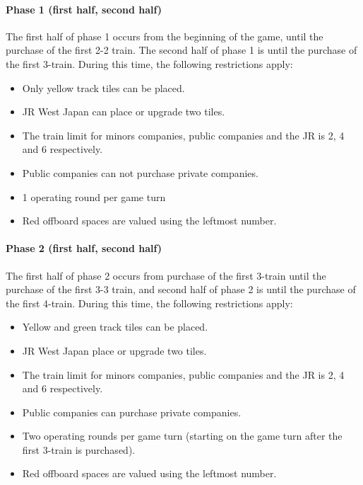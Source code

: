 \documentclass{article}
\begin{document}
\begin{CJK}{UTF8}{min}
\begin{multicols}{2}
\paragraph*{Phase 1 (first half, second half)}
The first half of phase 1 occurs from the beginning of the game, until
the purchase of the first 2-2 train. The second half of phase 1 is
until the purchase of the first 3-train. During this time, the
following restrictions apply:
\begin{itemize}
\item Only yellow track tiles can be placed.
\item JR West Japan can place or upgrade two tiles.
\item The train limit for minors companies, public companies and the JR is
  2, 4 and 6 respectively.
\item Public companies can not purchase private companies.
\item 1 operating round per game turn
\item Red offboard spaces are valued using the leftmost number.
\end{itemize}

\paragraph*{Phase 2 (first half, second half)}
The first half of phase 2 occurs from purchase of the first 3-train
until the purchase of the first 3-3 train, and second half of phase 2
is until the purchase of the first 4-train. During this time, the
following restrictions apply:
\begin{itemize}
\item Yellow and green track tiles can be placed.
\item JR West Japan place or upgrade two tiles.
\item The train limit for minors companies, public companies and the JR is
  2, 4 and 6 respectively.
\item Public companies can purchase private companies.
\item Two operating rounds per game turn (starting on the game turn after
  the first 3-train is purchased).
\item Red offboard spaces are valued using the leftmost number.
\end{itemize}


\end{multicols}
\end{CJK}
\end{document}
